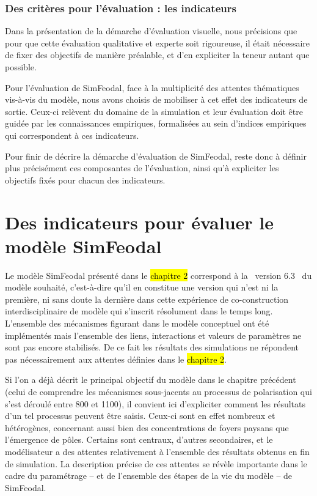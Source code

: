 \subsubsection{Des critères pour l'évaluation : les indicateurs}
%

Dans la présentation de la démarche d'évaluation visuelle, nous précisions que pour que cette évaluation qualitative et experte soit rigoureuse, il était nécessaire de fixer des objectifs de manière préalable, et d'en expliciter la teneur autant que possible.

Pour l'évaluation de SimFeodal, face à la multiplicité des attentes thématiques vis-à-vis du modèle, nous avons choisis de mobiliser à cet effet des \og indicateurs de sortie\fg{}.
Ceux-ci relèvent du domaine de la simulation et leur évaluation doit être guidée par les connaissances empiriques, formalisées au sein d'\og indices empiriques\fg{} qui correspondent à ces indicateurs.

Pour finir de décrire la démarche d'évaluation de SimFeodal, reste donc à définir plus précisément ces composantes de l'évaluation, ainsi qu'à expliciter les objectifs fixés pour chacun des indicateurs.
\clearpage


\section[Des indicateurs pour SimFeodal]{Des indicateurs pour évaluer le modèle SimFeodal}

Le modèle SimFeodal présenté dans le \hl{chapitre 2} correspond à la \og version 6.3 \fg{} du modèle souhaité, c'est-à-dire qu'il en constitue une version qui n'est ni la première, ni sans doute la dernière dans cette expérience de co-construction interdisciplinaire de modèle qui s'inscrit résolument dans le temps long.
L'ensemble des mécanismes figurant dans le modèle conceptuel ont été implémentés mais l'ensemble des liens, interactions et valeurs de paramètres ne sont pas encore stabilisés.
De ce fait les résultats des simulations ne répondent pas nécessairement aux attentes définies dans le \hl{chapitre 2}.

Si l'on a déjà décrit le principal objectif du modèle dans le chapitre précédent (celui de comprendre les mécanismes sous-jacents au processus de polarisation qui s'est déroulé entre 800 et 1100), il convient ici d'expliciter comment les résultats d'un tel processus peuvent être saisis.
Ceux-ci sont en effet nombreux et hétérogènes, concernant aussi bien des concentrations de foyers paysans que l'émergence de pôles.
Certains sont centraux, d'autres secondaires, et le modélisateur a des attentes relativement à l'ensemble des résultats obtenus en fin de simulation.
La description précise de ces attentes se révèle importante dans le cadre du paramétrage -- et de l'ensemble des étapes de la vie du modèle -- de SimFeodal.

